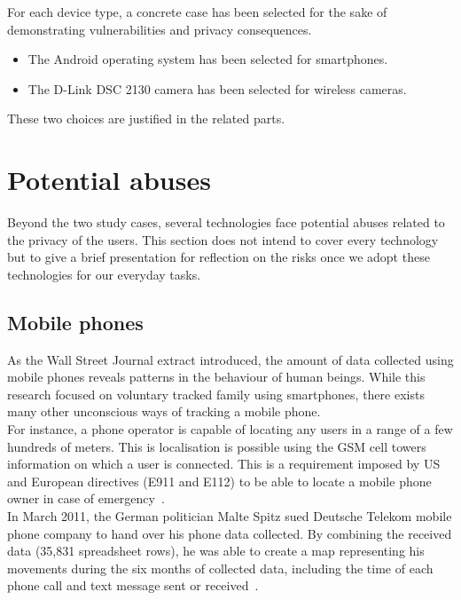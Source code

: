 For each device type, a concrete case has been selected for the sake of demonstrating
vulnerabilities and privacy consequences.
\begin{itemize}
\item The Android operating system has been selected for smartphones.
\item The D-Link DSC 2130 camera has been selected for wireless cameras.
\end{itemize}
These two choices are justified in the related parts.

\section{Potential abuses}

Beyond the two study cases, several technologies face potential abuses related to the privacy of the users.
This section does not intend to cover every technology but to give a brief presentation for reflection on the risks once we adopt these technologies for our everyday tasks.\\

\subsection{Mobile phones}

As the Wall Street Journal extract introduced, the amount of data collected using mobile phones reveals patterns in the behaviour of human beings.
While this research focused on voluntary tracked family using smartphones, there exists many other unconscious ways of tracking a mobile phone.\\

For instance, a phone operator is capable of locating any users in a range of a few hundreds of meters.
This is localisation is possible using the GSM cell towers information on which a user is connected.
This is a requirement imposed by US and European directives (E911 and E112) to be able to locate a mobile phone owner in case of emergency~\cite{e112-recom}.\\

In March 2011, the German politician Malte Spitz sued Deutsche Telekom mobile phone company to hand over his phone data collected.
By combining the received data (35,831 spreadsheet rows), he was able to create a map representing his movements during the six months of collected data, including the time of each phone call and text message sent or received~\cite{german-phone-tracking}.

